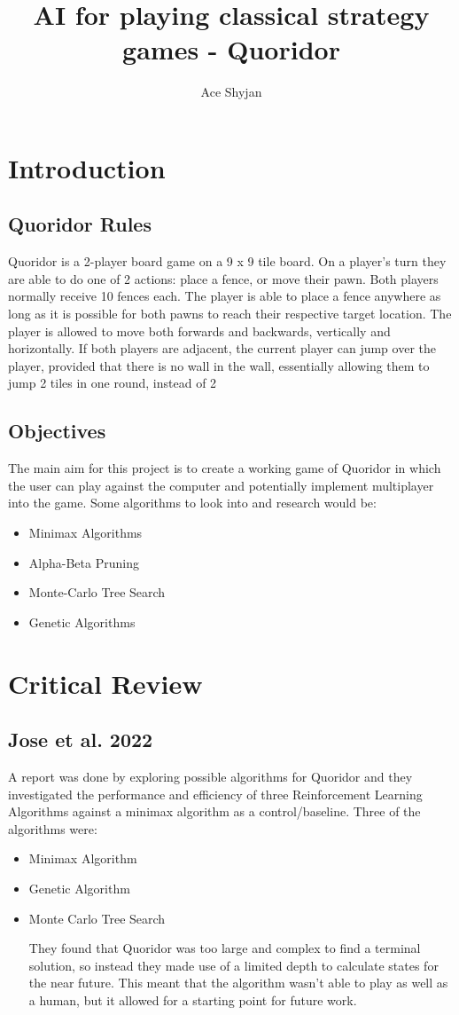 \documentclass[review]{cmpreport}
\title{AI for playing classical strategy games - Quoridor}
\author{Ace Shyjan}
\begin{document}
\section{Introduction}

\subsection{Quoridor Rules}
Quoridor is a 2-player board game on a 9 x 9 tile board. On a player's turn they are able to do one of 2 actions: place a fence, or move their pawn. Both players normally receive 10 fences each. The player is able to place a fence anywhere as long as it is possible for both pawns to reach their respective target location. The player is allowed to move both forwards and backwards, vertically and horizontally. If both players are adjacent, the current player can jump over the player, provided that there is no wall in the wall, essentially allowing them to jump 2 tiles in one round, instead of 2

\subsection{Objectives}
The main aim for this project is to create a working game of Quoridor in which the user can play against the computer and potentially implement multiplayer into the game.
Some algorithms to look into and research would be:
\begin{itemize}
    \item Minimax Algorithms
    \item Alpha-Beta Pruning
    \item Monte-Carlo Tree Search
    \item Genetic Algorithms
\end{itemize}

\section{Critical Review}

\subsection{Jose et al. 2022}
A report was done by \cite{josequoridor} exploring possible algorithms for Quoridor and they investigated the performance and efficiency of three Reinforcement Learning Algorithms against a minimax algorithm as a control/baseline.
Three of the algorithms were:
\begin{itemize}
    \item Minimax Algorithm
    \item Genetic Algorithm
    \item Monte Carlo Tree Search

They found that Quoridor was too large and complex to find a terminal solution, so instead they made use of a limited depth to calculate states for the near future. This meant that the algorithm wasn't able to play as well as a human, but it allowed for a starting point for future work.
\end{itemize}
\end{document}
